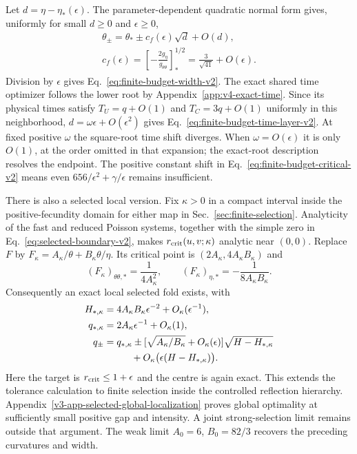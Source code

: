 \documentclass[aps,pre,reprint,amsmath,amssymb,longbibliography]{revtex4-2}
\begin{document}
Let $d=\eta-\eta_*(\epsilon)$. The parameter-dependent
quadratic normal form gives, uniformly for small $d\geq0$ and
$\epsilon\geq0$,
\begin{equation}
 \begin{gathered}
 \theta_\pm=\theta_*\pm c_f(\epsilon)\sqrt d+O(d),\\
 c_f(\epsilon)=
 \left[-\frac{2g_\eta}{g_{\theta\theta}}\right]_*^{1/2}
 =\frac3{\sqrt{41}}+O(\epsilon).
 \end{gathered}
 \label{eq:app-fold-root-v2}
\end{equation}
Division by $\epsilon$ gives Eq.~\eqref{eq:finite-budget-width-v2}.
The exact shared time optimizer follows the lower root by
Appendix~\ref{app:v4-exact-time}. Since its physical times satisfy
$T_U=q+O(1)$ and $T_C=3q+O(1)$ uniformly in this neighborhood,
$d=\omega\epsilon+O(\epsilon^2)$ gives
Eq.~\eqref{eq:finite-budget-time-layer-v2}. At fixed positive $\omega$
the square-root time shift diverges. When $\omega=O(\epsilon)$ it
is only $O(1)$, at the order omitted in that expansion; the exact-root
description resolves the endpoint. The positive constant shift in
Eq.~\eqref{eq:finite-budget-critical-v2} means even
$656/\epsilon^2+\gamma/\epsilon$ remains insufficient.

There is also a selected local version. Fix $\kappa>0$ in a compact
interval inside the positive-fecundity domain for either map in
Sec.~\ref{sec:finite-selection}. Analyticity of the fast and reduced
Poisson systems, together with the simple zero in
Eq.~\eqref{eq:selected-boundary-v2}, makes $r_{\rm crit}(u,v;\kappa)$
analytic near $(0,0)$. Replace $F$ by
$F_\kappa=A_\kappa/\theta+B_\kappa\theta/\eta$. Its critical point
is $(2A_\kappa,4A_\kappa B_\kappa)$ and
\begin{equation}
 (F_\kappa)_{\theta\theta,*}=\frac{1}{4A_\kappa^2},\qquad
 (F_\kappa)_{\eta,*}=-\frac{1}{8A_\kappa B_\kappa}.
 \label{eq:app-selected-fold-curvature-v2}
\end{equation}
Consequently an exact local selected fold exists, with
\begin{equation}
 \begin{aligned}
 H_{*,\kappa}&=4A_\kappa B_\kappa\epsilon^{-2}
                              +O_\kappa(\epsilon^{-1}),\\
 q_{*,\kappa}&=2A_\kappa\epsilon^{-1}+O_\kappa(1),\\
 q_\pm&=q_{*,\kappa}\pm
       [\sqrt{A_\kappa/B_\kappa}+O_\kappa(\epsilon)]
                 \sqrt{H-H_{*,\kappa}}\\
       &\hspace{10mm}+O_\kappa\bigl(\epsilon(H-H_{*,\kappa})\bigr).
 \end{aligned}
 \label{eq:app-selected-fold-v2}
\end{equation}
Here the target is $r_{\rm crit}\leq1+\epsilon$ and the centre
is again exact. This extends the tolerance calculation to finite
selection inside the controlled reflection hierarchy.
Appendix~\ref{v3-app-selected-global-localization} proves global
optimality at sufficiently small positive gap and intensity.
A joint strong-selection limit remains outside that argument. The weak limit $A_0=6$, $B_0=82/3$ recovers the preceding
curvatures and width.
\end{document}
